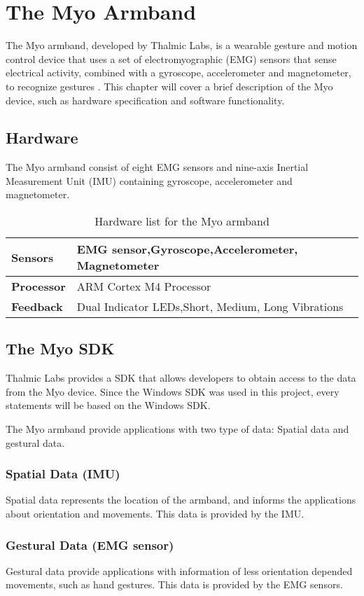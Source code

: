 \chapter{The Myo Armband}
\label{chap:myo}
The Myo armband, developed by Thalmic Labs, is a wearable gesture and motion control device that uses a set of electromyographic (EMG) sensors that sense electrical activity, combined with a gyroscope, accelerometer and magnetometer, to recognize gestures \cite{myo}. This chapter will cover a brief description of the Myo device, such as hardware specification and software functionality.

\section{Hardware}
The Myo armband consist of eight EMG sensors and nine-axis Inertial Measurement Unit (IMU) containing gyroscope, accelerometer and magnetometer.

\begin{table}[h!]
\centering
    \begin{tabular}{ | l | p{8cm} |}
        \hline
        \textbf{Sensors} & EMG sensor,\newline Gyroscope,\newline Accelerometer, \newline Magnetometer\\ \hline
        
        \textbf{Processor} & ARM Cortex M4 Processor  \\ \hline
        
        \textbf{Feedback} & Dual Indicator LEDs,\newline Short, Medium, Long Vibrations  \\ \hline
    \end{tabular}
    \caption{Hardware list for the Myo armband}
    \label{table:myo_hardware}
\end{table}

\section{The Myo SDK}
\label{sec:myoSDK}
Thalmic Labs provides a SDK that allows developers to obtain access to the data from the Myo device. Since the Windows SDK was used in this project, every statements will be based on the Windows SDK.

The Myo armband provide applications with two type of data: Spatial data and gestural data.

\subsection{Spatial Data (IMU)}
Spatial data represents the location of the armband, and informs the applications about orientation and movements. This data is provided by the IMU. 

\subsection{Gestural Data (EMG sensor)}
Gestural data provide applications with information of less orientation depended movements, such as hand gestures. This data is provided by the EMG sensors.   
